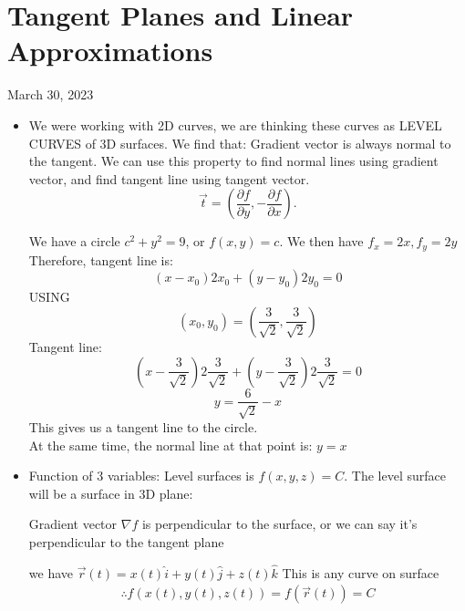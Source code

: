 \section{Tangent Planes and Linear Approximations}
March 30, 2023
\begin{itemize}
	\item We were working with 2D curves, we are thinking these curves as LEVEL CURVES of 3D surfaces. We find that: Gradient vector is always normal to the tangent. We can use this property to find normal lines using gradient vector, and find tangent line using tangent vector.
		\[
		\vec{t} = \left( \frac{\partial f}{\partial y} ,-\frac{\partial f}{\partial x}  \right) 
		.\] 
		\begin{example}
			We have a circle $ c^2 + y^2 = 9$, or $f\left( x,y \right) = c$. We then have $f_x = 2x, f_y = 2y$\\
			Therefore, tangent line is:
			\begin{equation}
				\left( x-x_0 \right) 2x_0 + \left( y-y_0 \right) 2y_0 = 0
			\end{equation}
			USING
			\begin{equation}
				\left( x_0,y_0 \right)  = \left( \frac{3}{\sqrt{2}}, \frac{3}{\sqrt{2} } \right) 
			\end{equation}
			Tangent line:
			\begin{equation}
				\left( x-\frac{3}{\sqrt{2} } \right) 2 \frac{3}{\sqrt{2} } + \left( y-\frac{3}{\sqrt{2} } \right) 2 \frac{3}{\sqrt{2} } = 0 
			\end{equation}
			\begin{equation}
				y = \frac{6}{\sqrt{2} }-x
			\end{equation}
			This gives us a tangent line to the circle.\\
			At the same time, the normal line at that point is: $y=x$
		\end{example}
	\item Function of 3 variables:
		Level surfaces is $f\left( x,y,z \right) = C$. The level surface will be a surface in 3D plane:\\
		\begin{idea}
			Gradient vector $\nabla f$ is perpendicular to the surface, or we can say it's perpendicular to the tangent plane
		\end{idea}
\begin{example}
	we have $\vec{r}(t) = x(t)\hat{i} + y(t) \hat{j} + z(t) \hat{k}$ This is any curve on surface
	\begin{align*}
		\therefore f\left( x(t),y(t),z(t) \right)= f\left( \vec{r}(t) \right) = C \\

\end{align*}
\end{example}
\end{itemize}
